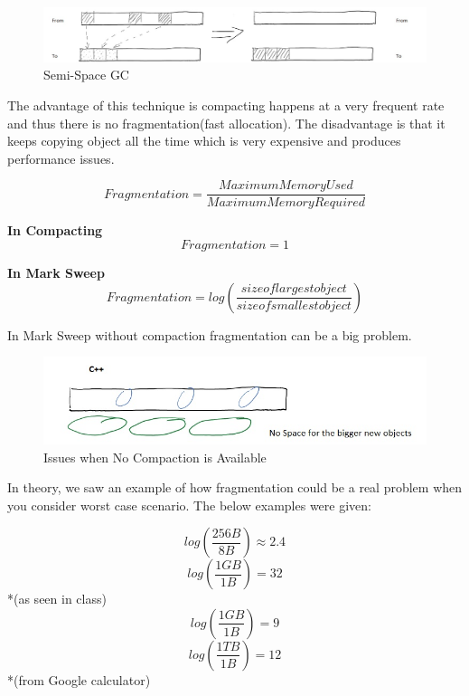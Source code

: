 \documentclass[twoside]{article}
\begin{document}
\begin{figure}[ht!]
\center
\includegraphics[width=150mm]{Semi_Space.jpg}
\caption{ Semi-Space GC \label{semiSpace}}
\end{figure}

The advantage of this technique is compacting happens at a very frequent rate and thus there is no fragmentation(fast allocation). The disadvantage is that it keeps copying object all the time which is very expensive and produces performance issues.

\[
	Fragmentation = \frac{Maximum Memory Used}{Maximum Memory Required}
\]


\begin{center}
	\textbf{In Compacting} \[Fragmentation = 1\]
\end{center}

\begin{center}
	\textbf{In Mark Sweep} 
	\[
		Fragmentation = log(\frac{size of largest object}{size of smallest object})
	\]
\end{center} 



In Mark Sweep without compaction fragmentation can be a big problem.

\begin{figure}[ht!]
\center
\includegraphics[width=150mm]{No_Compacting_Issues.jpg}
\caption{ Issues when No Compaction is Available \label{noCompactingIssues}}
\end{figure}

In theory, we saw an example of how fragmentation could be a real problem when you consider worst case scenario. The below examples were given:

\begin{multicols}{2}
\begin{center}
\[log(\frac{256B}{8B}) \approx 2.4 \]
\[log(\frac{1GB}{1B}) = 32 \] *(as seen in class)
\columnbreak
\[log(\frac{1GB}{1B}) = 9 \]
\[log(\frac{1TB}{1B}) = 12 \]*(from Google calculator)
\end{center}

\end{multicols}
\end{document}
